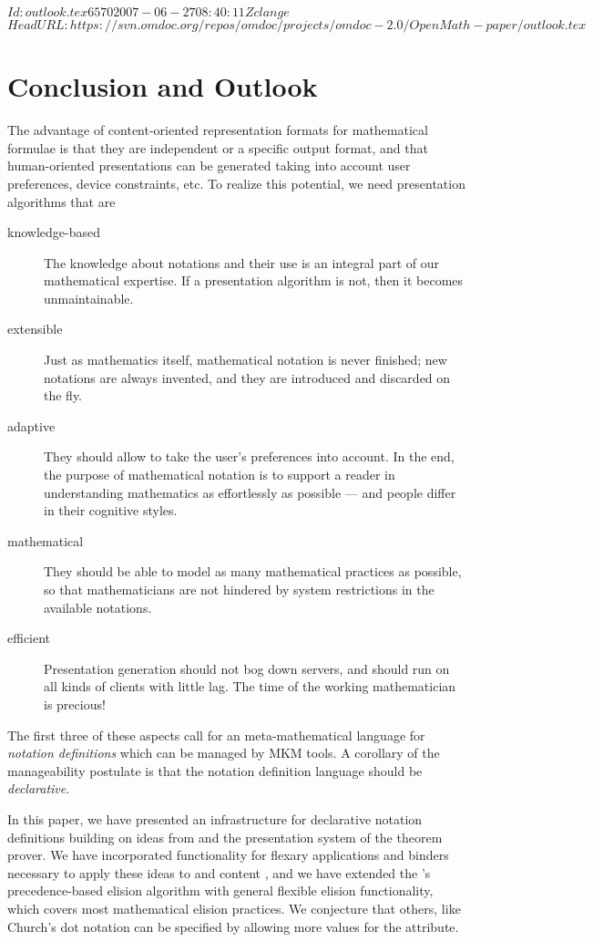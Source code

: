 \svnInfo $Id: outlook.tex 6570 2007-06-27 08:40:11Z clange $
\svnKeyword $HeadURL: https://svn.omdoc.org/repos/omdoc/projects/omdoc-2.0/OpenMath-paper/outlook.tex $
\section{Conclusion and Outlook}\label{sec:outlook}

The advantage of content-oriented representation formats for mathematical formulae is that
they are independent or a specific output format, and that human-oriented presentations
can be generated taking into account user preferences, device constraints, etc. To realize
this potential, we need presentation algorithms that are
\begin{description}
\item[knowledge-based] The knowledge about notations and their use is an integral part of
  our mathematical expertise. If a presentation algorithm is not, then it becomes
  unmaintainable.
\item[extensible] Just as mathematics itself, mathematical notation is never finished; new
  notations are always invented, and they are introduced and discarded on the fly.
\item[adaptive] They should allow to take the user's preferences into account. In the end,
  the purpose of mathematical notation is to support a reader in understanding mathematics
  as effortlessly as possible --- and people differ in their cognitive styles.
\item[mathematical] They should be able to model as many mathematical practices as
  possible, so that mathematicians are not hindered by system restrictions in the
  available notations.
\item[efficient] Presentation generation should not bog down servers, and should run on
  all kinds of clients with little lag. The time of the working mathematician is precious!
\end{description}
The first three of these aspects call for an meta-mathematical language for
{\emph{notation definitions}} which can be managed by MKM tools. A corollary of the
manageability postulate is that the notation definition language should be
{\emph{declarative}}. 

In this paper, we have presented an infrastructure for declarative notation definitions
building on ideas from {} and the presentation system of the {\isabelle}
theorem prover. We have incorporated functionality for flexary applications and binders
necessary to apply these ideas to {\openmath} and content {\mathml}, and we have extended
the {\isabelle}'s precedence-based elision algorithm with general flexible elision
functionality, which covers most mathematical elision practices. We conjecture that
others, like Church's dot notation can be specified by allowing more values for the
{} attribute.

